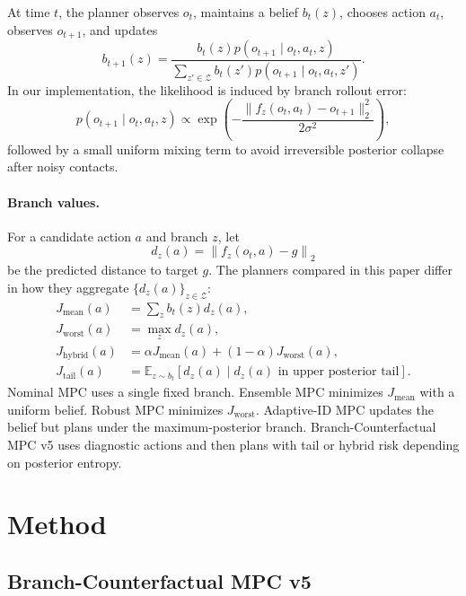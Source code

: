 \documentclass{article}
\newcommand{\methodv}{Branch-Counterfactual MPC v5}
\newcommand{\latent}{z}
\newcommand{\obs}{o}
\newcommand{\act}{a}
\newcommand{\branchset}{\mathcal{Z}}
\newcommand{\expect}{\mathbb{E}}
\begin{document}
At time $t$, the planner observes $\obs_t$, maintains a belief $b_t(\latent)$, chooses action $\act_t$, observes $\obs_{t+1}$, and updates
\[
  b_{t+1}(\latent) =
  \frac{b_t(\latent) p(\obs_{t+1} \mid \obs_t,\act_t,\latent)}
  {\sum_{\latent' \in \branchset} b_t(\latent') p(\obs_{t+1} \mid \obs_t,\act_t,\latent')}.
\]
In our implementation, the likelihood is induced by branch rollout error:
\[
  p(\obs_{t+1} \mid \obs_t,\act_t,\latent)
  \propto
  \exp\left(-\frac{\|f_{\latent}(\obs_t,\act_t)-\obs_{t+1}\|_2^2}{2\sigma^2}\right),
\]
followed by a small uniform mixing term to avoid irreversible posterior collapse after noisy contacts.

\paragraph{Branch values.}
For a candidate action $\act$ and branch $\latent$, let
\[
  d_{\latent}(\act) =
  \left\| f_{\latent}(\obs_t,\act)-g \right\|_2
\]
be the predicted distance to target $g$.  The planners compared in this paper differ in how they aggregate $\{d_{\latent}(\act)\}_{\latent \in \branchset}$:
\begin{align}
  J_{\mathrm{mean}}(\act) &= \sum_{\latent} b_t(\latent)d_{\latent}(\act),\\
  J_{\mathrm{worst}}(\act) &= \max_{\latent} d_{\latent}(\act),\\
  J_{\mathrm{hybrid}}(\act) &= \alpha J_{\mathrm{mean}}(\act) + (1-\alpha)J_{\mathrm{worst}}(\act),\\
  J_{\mathrm{tail}}(\act) &= \expect_{\latent \sim b_t}\left[d_{\latent}(\act) \mid d_{\latent}(\act) \text{ in upper posterior tail}\right].
\end{align}
Nominal MPC uses a single fixed branch.  Ensemble MPC minimizes $J_{\mathrm{mean}}$ with a uniform belief.  Robust MPC minimizes $J_{\mathrm{worst}}$.  Adaptive-ID MPC updates the belief but plans under the maximum-posterior branch.  \methodv{} uses diagnostic actions and then plans with tail or hybrid risk depending on posterior entropy.

\section{Method}

\subsection{Branch-Counterfactual MPC v5}
\end{document}
